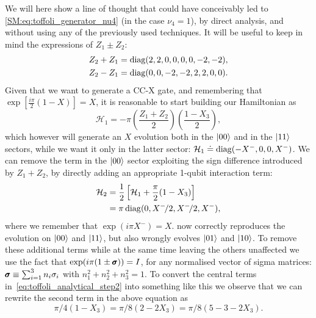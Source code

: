 We will here show a line of thought that could have conceivably led to \cref{SM:eq:toffoli_generator_nu4} (in the case $\nu_4=1$), by direct analysis, and without using any of the previously used techniques.
It will be useful to keep in mind the expressions of $Z_1 \pm Z_2$:
\begin{equation}
\begin{aligned}
	Z_2 + Z_1 &= \operatorname{diag}(2, 2, 0, 0, 0, 0, -2, -2), \\
	Z_2 - Z_1 &= \operatorname{diag}(0, 0, -2, -2, 2, 2, 0, 0).
\end{aligned}
\end{equation}
Given that we want to generate a CC-X gate, and remembering that
$\exp\left[\frac{i\pi}{2}(1-X)\right] = X$, it is reasonable to start building our Hamiltonian as
\begin{equation}
	\mathcal H_1 = - \pi \left(\frac{Z_1+Z_2}{2}\right)\left(\frac{1-X_3}{2}\right),
\end{equation}
which however will generate an $X$ evolution both in the $\ket{00}$ and in the $\ket{11}$ sectors, while we want it only in the latter sector:
	$\mathcal H_1 \doteq \operatorname{diag}(-X^-, 0, 0, X^-)$.
We can remove the term in the $\ket{00}$ sector exploiting the sign difference introduced by $Z_1 + Z_2$, by directly adding an appropriate 1-qubit interaction term:
\begin{equation}
\begin{aligned}
	\mathcal H_2 &= \frac{1}{2} \left[ \mathcal H_1 + \frac{\pi}{2} (1 - X_3) \right] \\
				 &= \pi \operatorname{diag}(0, X^-\!/2, X^-\!/2, X^-),
\end{aligned}
\label{eq:toffoli_analytical_step2}
\end{equation}
where we remember that $\exp(i\pi X^-) = X$.
 now correctly reproduces the evolution on $\ket{00}$ and $\ket{11}$, but also wrongly evolves $\ket{01}$ and $\ket{10}$.
To remove these additional terms while at the same time leaving the others unaffected we use the fact that
$\exp(i\pi (1 \pm \pmb{\sigma})) = I$, for any normalised vector of sigma matrices: $\pmb{\sigma} \equiv \sum_{i=1}^3 n_i \sigma_i$ with $n_1^2 + n_2^2 + n_3^2 = 1$.
To convert the central terms in~\cref{eq:toffoli_analytical_step2} into something like this we observe that we can rewrite the second term in the above equation as
\begin{equation}
	\pi/4(1-X_3) = \pi/8(2 - 2 X_3) = \pi/8(5 - 3 - 2 X_3).
\end{equation}
